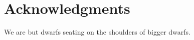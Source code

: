 
\cleartorecto %
\chapter{Acknowledgments} %
\thispagestyle{plain} %

We are but dwarfs seating on the shoulders of bigger dwarfs.
